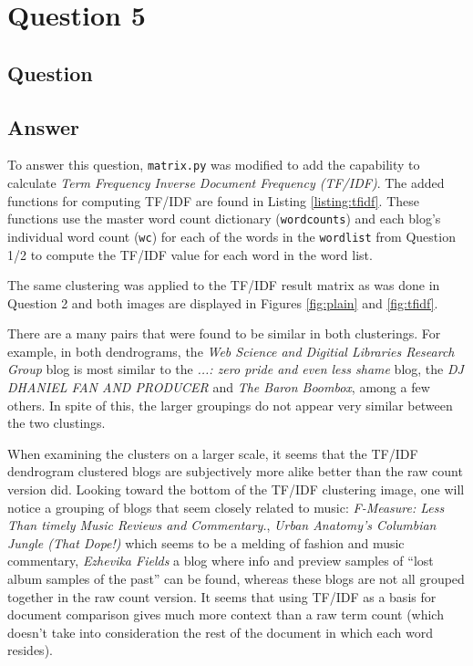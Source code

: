 \section{Question 5}

\subsection{Question}


\subsection{Answer}

To answer this question, {\tt matrix.py} was modified to add the capability to calculate {\it Term Frequency Inverse Document Frequency (TF/IDF)}. The added functions for computing TF/IDF are found in Listing \ref{listing:tfidf}. These functions use the master word count dictionary ({\tt wordcounts}) and each blog's individual word count ({\tt wc}) for each of the words in the {\tt wordlist} from Question 1/2 to compute the TF/IDF value for each word in the word list. 







The same clustering was applied to the TF/IDF result matrix as was done in Question 2 and both images are displayed in Figures \ref{fig:plain} and \ref{fig:tfidf}.

There are a many pairs that were found to be similar in both clusterings. For example, in both dendrograms, the {\it Web Science and Digitial Libraries Research Group} blog is most similar to the {\it ...: zero pride and even less shame} blog, the {\it DJ DHANIEL FAN AND PRODUCER} and {\it The Baron Boombox}, among a few others. In spite of this, the larger groupings do not appear very similar between the two clustings.

When examining the clusters on a larger scale, it seems that the TF/IDF dendrogram clustered blogs are subjectively more alike better than the raw count version did. Looking toward the bottom of the TF/IDF clustering image, one will notice a grouping of blogs that seem closely related to music: {\it F-Measure: Less Than timely Music Reviews and Commentary.}, {\it Urban Anatomy's Columbian Jungle (That Dope!)} which seems to be a melding of fashion and music commentary, {\it Ezhevika Fields} a blog where info and preview samples of ``lost album samples of the past'' can be found, whereas these blogs are not all grouped together in the raw count version. It seems that using TF/IDF as a basis for document comparison gives much more context than a raw term count (which doesn't take into consideration the rest of the document in which each word resides).

